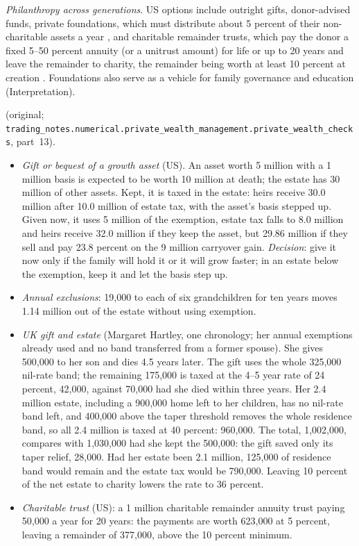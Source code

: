\begin{qfmethod}
\emph{Philanthropy across generations}. US options include outright gifts, donor-advised funds, private foundations, which must distribute about 5 percent of their non-charitable assets a year \citep[sec.~4942(e)]{us-internal-revenue-code-26}, and charitable remainder trusts, which pay the donor a fixed 5--50 percent annuity (or a unitrust amount) for life or up to 20 years and leave the remainder to charity, the remainder being worth at least 10 percent at creation \citep[sec.~664(d)]{us-internal-revenue-code-26}. Foundations also serve as a vehicle for family governance and education (Interpretation).

 (original; \nolinkurl{trading_notes.numerical.private_wealth_management.private_wealth_checks}, part~13).
\begin{itemize}
\item \emph{Gift or bequest of a growth asset} (US). An asset worth 5 million with a 1 million basis is expected to be worth 10 million at death; the estate has 30 million of other assets. Kept, it is taxed in the estate: heirs receive 30.0 million after 10.0 million of estate tax, with the asset's basis stepped up. Given now, it uses 5 million of the exemption, estate tax falls to 8.0 million and heirs receive 32.0 million if they keep the asset, but 29.86 million if they sell and pay 23.8 percent on the 9 million carryover gain. \emph{Decision}: give it now only if the family will hold it or it will grow faster; in an estate below the exemption, keep it and let the basis step up.
\item \emph{Annual exclusions}: 19,000 to each of six grandchildren for ten years moves 1.14 million out of the estate without using exemption.
\item \emph{UK gift and estate} (Margaret Hartley, one chronology; her annual exemptions already used and no band transferred from a former spouse). She gives 500,000 to her son and dies 4.5 years later. The gift uses the whole 325,000 nil-rate band; the remaining 175,000 is taxed at the 4--5 year rate of 24 percent, 42,000, against 70,000 had she died within three years. Her 2.4 million estate, including a 900,000 home left to her children, has no nil-rate band left, and 400,000 above the taper threshold removes the whole residence band, so all 2.4 million is taxed at 40 percent: 960,000. The total, 1,002,000, compares with 1,030,000 had she kept the 500,000: the gift saved only its taper relief, 28,000. Had her estate been 2.1 million, 125,000 of residence band would remain and the estate tax would be 790,000. Leaving 10 percent of the net estate to charity lowers the rate to 36 percent.
\item \emph{Charitable trust} (US): a 1 million charitable remainder annuity trust paying 50,000 a year for 20 years: the payments are worth 623,000 at 5 percent, leaving a remainder of 377,000, above the 10 percent minimum.
\end{itemize}


\end{qfmethod}
